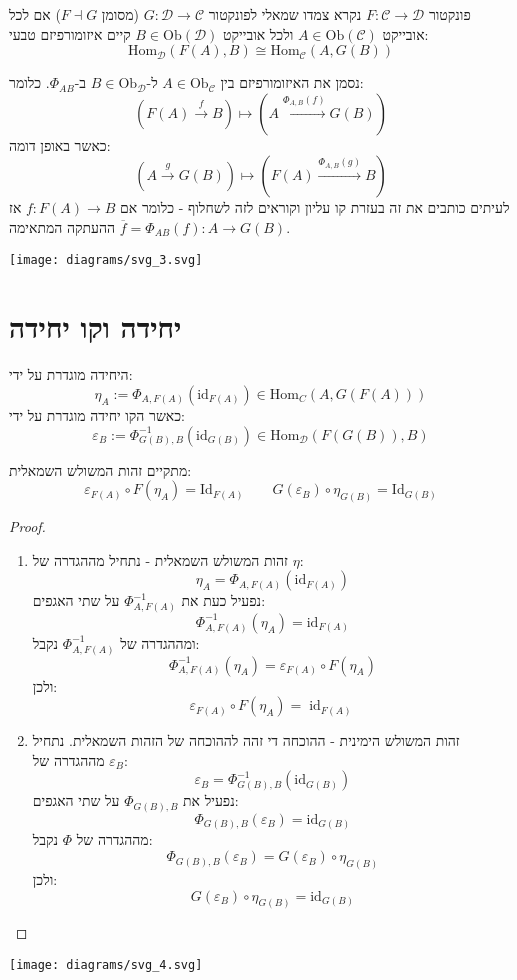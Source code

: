 \documentclass{tstextbook}
\begin{document}
\begin{definition}[צמוד]
פונקטור \(F: \mathcal{C} \to \mathcal{D}\) נקרא צמדו שמאלי לפונקטור \(G: \mathcal{D} \to \mathcal{C}\) (מסומן \(F \dashv G\)) אם לכל אובייקט \(A \in \mathrm{Ob}(\mathcal{C})\) ולכל אובייקט \(B \in \mathrm{Ob}(\mathcal{D})\) קיים איזומורפיזם טבעי:
$$\mathrm{Hom}_{\mathcal{D} }(F(A),B)\cong  \mathrm{Hom}_{\mathcal{C} }(A,G(B))$$

\end{definition}
\begin{symbolize}
נסמן את האיזומורפיזם בין \(A\in \mathrm{Ob}_{\mathcal{C}}\) ל-\(B\in \mathrm{Ob}_{\mathcal{D}}\) ב-\(\Phi_{AB}\). כלומר:
$$(F(A)\xrightarrow{f}B)\mapsto(A\xrightarrow{\Phi_{A,B}(f)}G(B))$$
כאשר באופן דומה:
$$(A\xrightarrow{g} G(B))\mapsto(F(A)\xrightarrow{\Phi_{A,B}(g)}B)$$
לעיתים כותבים את זה בעזרת קו עליון וקוראים לזה לשחלוף - כלומר אם \(f:F(A)\to B\) אז \(\overline{f}=\Phi_{AB}(f):A\to G(B)\) ההעתקה המתאימה.

\end{symbolize}
\texttt{[image: diagrams/svg\_3.svg]}
\section{יחידה וקו יחידה}

\begin{definition}
היחידה מוגדרת על ידי:
$$\eta_{A}:=\Phi_{A,F(A)}(\mathrm{id}_{F(A)})\in\mathrm{Hom}_{C}(A,G(F(A)))$$
כאשר הקו יחידה מוגדרת על ידי:
$$\varepsilon_{B}:=\Phi_{G(B),B}^{-1}(\mathrm{id}_{G(B)})\in\mathrm{Hom}_{\mathcal{D}}(F(G(B)),B)$$

\end{definition}
\begin{proposition}
מתקיים זהות המשולש השמאלית:
$$\varepsilon_{F(A)}\circ  F(\eta_{A})=\mathrm{Id}_{F(A)}\qquad G(\varepsilon_{B})\circ \eta_{G(B)}=\mathrm{Id}_{G(B)}$$

\end{proposition}
\begin{proof}
  \begin{enumerate}
    \item זהות המשולש השמאלית - נתחיל מההגדרה של \(\eta\): 
$$\eta_{A}=\Phi_{A,F(A)}(\mathrm{id}_{F(A)})$$
נפעיל כעת את \(\Phi ^{-1}_{A,F(A)}\) על שתי האגפים:
$$\Phi_{A,F(A)}^{-1}(\eta_{A})=\mathrm{id}_{F(A)}$$
ומההגדרה של \(\Phi ^{-1}_{A,F(A)}\) נקבל:
$$\Phi_{A,F(A)}^{-1}(\eta_{A})=\varepsilon_{F(A)}\circ F(\eta_{A})$$
ולכן:
$$\varepsilon_{F(A)}\circ F(\eta_{A})=\operatorname{id}_{F(A)}$$


    \item זהות המשולש הימינית - ההוכחה די זהה לההוכחה של הזהות השמאלית. נתחיל מההגדרה של \(\varepsilon_{B}\): 
$$\varepsilon_{B}=\Phi_{G(B),B}^{-1}(\mathrm{id}_{G(B)})$$
נפעיל את \(\Phi_{G(B),B}\) על שתי האגפים:
$$\Phi_{G(B),B}(\varepsilon_{B})=\mathrm{id}_{G(B)}$$
מההגדרה של \(\Phi\) נקבל:
$$\Phi_{G(B),B}(\varepsilon_{B})=G(\varepsilon_{B})\circ\eta_{G(B)}$$
ולכן:
$$G(\varepsilon_{B})\circ\eta_{G(B)}=\mathrm{id}_{G(B)}$$


  \end{enumerate}
\end{proof}
\texttt{[image: diagrams/svg\_4.svg]}
\end{document}

